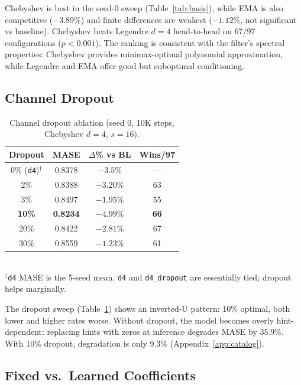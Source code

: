 \documentclass{article}
\begin{document}
Chebyshev is best in the seed-0 sweep (Table~\ref{tab:basis}), while EMA is also competitive ($-3.89\%$) and finite differences are weakest ($-1.12\%$, not significant vs baseline). Chebyshev beats Legendre $d{=}4$ head-to-head on 67/97 configurations ($p < 0.001$). The ranking is consistent with the filter's spectral properties: Chebyshev provides minimax-optimal polynomial approximation, while Legendre and EMA offer good but suboptimal conditioning.

\subsection{Channel Dropout}

\begin{table}[t]
\centering
\caption{Channel dropout ablation (seed 0, 10K steps, Chebyshev $d=4$, $s=16$).}
\label{tab:dropout}
\small
\begin{tabular}{cccc}
\toprule
\textbf{Dropout} & \textbf{MASE} & \textbf{$\Delta$\% vs BL} & \textbf{Wins/97} \\
\midrule
0\% (\texttt{d4})$^\dagger$ & 0.8378 & $-3.5\%$ & --- \\
2\% & 0.8388 & $-3.20\%$ & 63 \\
3\% & 0.8497 & $-1.95\%$ & 55 \\
\textbf{10\%} & \textbf{0.8234} & $\mathbf{-4.99\%}$ & \textbf{66} \\
20\% & 0.8422 & $-2.81\%$ & 67 \\
30\% & 0.8559 & $-1.23\%$ & 61 \\
\bottomrule
\end{tabular}
\\[2pt]
{\footnotesize $^\dagger$\texttt{d4} MASE is the 5-seed mean. \texttt{d4} and \texttt{d4\_dropout} are essentially tied; dropout helps marginally.}
\end{table}

The dropout sweep (Table~\ref{tab:dropout}) shows an inverted-U pattern: 10\% optimal, both lower and higher rates worse. Without dropout, the model becomes overly hint-dependent: replacing hints with zeros at inference degrades MASE by 35.9\%. With 10\% dropout, degradation is only 9.3\% (Appendix~\ref{app:catalog}).

\subsection{Fixed vs.\ Learned Coefficients}
\end{document}
